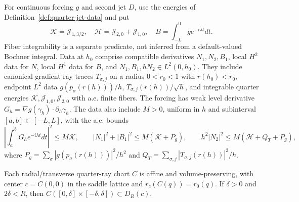 \begin{definition}
\label{def:weighted-numerator-data}
\leanok
For continuous forcing $g$ and second jet $D$, use the energies of
Definition~\ref{def:quarter-jet-data} and put
\[
 \mathcal K=\mathcal J_{1,3/2},\quad
 \mathcal H=\mathcal J_{2,0}+\mathcal J_{1,0},\quad
 B=\int_{-L}^0ge^{-i\lambda t}dt .
\]
Fiber integrability is a separate predicate, not inferred from a
default-valued Bochner integral. Data at $h_0$ comprise compatible
derivatives $N_1,N_2,B_1$, local $H^2$ data for $N$, local $H^1$ data for
$B$, and $N_1,B_1,hN_2\in L^2(0,h_0)$.
They include canonical gradient ray traces $T_{\sigma,j}$ on a radius
$0<r_0<1$ with $r(h_0)<r_0$, endpoint $L^2$ data
$g(p_\sigma(r(h)))/h$, $T_{\sigma,j}(r(h))/\sqrt h$, and integrable quarter
energies $\mathcal K,\mathcal J_{1,0},\mathcal J_{2,0}$ with a.e. finite fibers.
The forcing has weak level derivative
$G_h=\nabla g(\gamma_h)\cdot\partial_h\gamma_h$.
The data also include $M>0$, uniform in $h$ and subinterval $[a,b]\subset[-L,L]$,
with the a.e. bounds
\[
 \left|\int_a^bG_he^{-i\lambda t}dt\right|^2\le M\mathcal K,\qquad
 |N_1|^2+|B_1|^2\le M(\mathcal K+P_g),\qquad
 h^2|N_2|^2\le M(\mathcal H+Q_T+P_g),
\]
where $P_g=\sum_\sigma|g(p_\sigma(r(h)))|^2/h^2$ and
$Q_T=\sum_{\sigma,j}|T_{\sigma,j}(r(h))|^2/h$.
\end{definition}

\begin{lemma}
\label{lem:quarter-ray-affine-chart}
\leanok
Each radial/transverse quarter-ray chart $C$ is affine and volume-preserving,
with center $c=C(0,0)$ in the saddle lattice and
$r_c(C(q))=r_0(q)$. If $\delta>0$ and $2\delta<R$, then
$C([0,\delta]\times[-\delta,\delta])\subset D_R(c)$.
\end{lemma}

